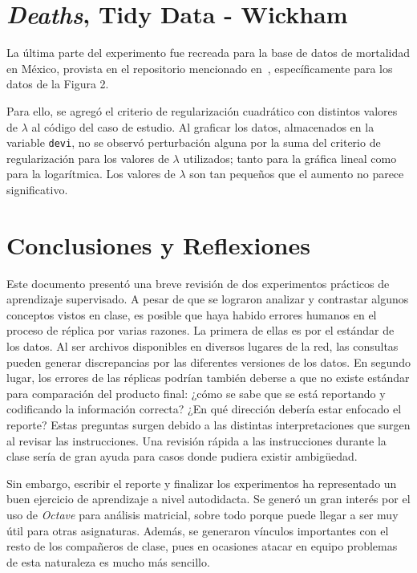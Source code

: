 \documentclass{llncs}
\begin{document}

\section{\textit{Deaths}, Tidy Data - Wickham} %
\label{sec:tidy}

La última parte del experimento fue recreada para la base de datos de mortalidad en México, provista en el repositorio mencionado en~\cite{JSSv059i10}, específicamente para los datos de la Figura 2.

Para ello, se agregó el criterio de regularización cuadrático con distintos valores de $\lambda$ al código del caso de estudio.
Al graficar los datos, almacenados en la variable \texttt{devi}, no se observó perturbación alguna por la suma del criterio de regularización para los valores de $\lambda$ utilizados;
tanto para la gráfica lineal como para la logarítmica.
Los valores de $\lambda$ son tan pequeños que el aumento no parece significativo.

\section{Conclusiones y Reflexiones}
\label{sec:conc}

Este documento presentó una breve revisión de dos experimentos prácticos de aprendizaje supervisado.
A pesar de que se lograron analizar y contrastar algunos conceptos vistos en clase, es posible que haya habido errores humanos en el proceso de réplica por varias razones.
La primera de ellas es por el estándar de los datos.
Al ser archivos disponibles en diversos lugares de la red, las consultas pueden generar discrepancias por las diferentes versiones de los datos.
En segundo lugar, los errores de las réplicas podrían también deberse a que no existe estándar para comparación del producto final: ¿cómo se sabe que se está reportando y codificando la información correcta?
¿En qué dirección debería estar enfocado el reporte?
Estas preguntas surgen debido a las distintas interpretaciones que surgen al revisar las instrucciones.
Una revisión rápida a las instrucciones durante la clase sería de gran ayuda para casos donde pudiera existir ambigüedad.

Sin embargo, escribir el reporte y finalizar los experimentos ha representado un buen ejercicio de aprendizaje a nivel autodidacta.
Se generó un gran interés por el uso de \textit{Octave} para análisis matricial,
sobre todo porque puede llegar a ser muy útil para otras asignaturas.
Además, se generaron vínculos importantes con el resto de los compañeros de clase, pues en ocasiones atacar en equipo problemas de esta naturaleza es mucho más sencillo.




\end{document}
